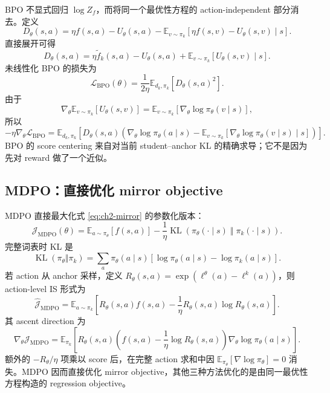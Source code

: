 BPO 不显式回归 $\log Z_f$，而将同一个最优性方程的 action-independent 部分消去。定义
\begin{equation}
\label{eq:ch2-bpo-residual}
D_\theta(s,a)
=\eta f(s,a)-U_\theta(s,a)
-\mathbb E_{v\sim\pi_k}[\eta f(s,v)-U_\theta(s,v)\mid s].
\end{equation}
直接展开可得
\[
D_\theta(s,a)
=\eta\widetilde f_k(s,a)-U_\theta(s,a)
+\mathbb E_{v\sim\pi_k}[U_\theta(s,v)\mid s].
\]
未线性化 BPO 的损失为
\begin{equation}
\label{eq:ch2-bpo-loss}
\mathcal L_{\mathrm{BPO}}(\theta)
=\frac1{2\eta}\mathbb E_{d_k,\pi_k}[D_\theta(s,a)^2].
\end{equation}
由于
\[
\nabla_\theta\mathbb E_{v\sim\pi_k}[U_\theta(s,v)]
=\mathbb E_{v\sim\pi_k}[\nabla_\theta\log\pi_\theta(v\mid s)],
\]
所以
\begin{equation}
\label{eq:ch2-bpo-gradient}
-\eta\nabla_\theta\mathcal L_{\mathrm{BPO}}
=\mathbb E_{d_k,\pi_k}\left[D_\theta(s,a)
\left(\nabla_\theta\log\pi_\theta(a\mid s)
-\mathbb E_{v\sim\pi_k}[\nabla_\theta\log\pi_\theta(v\mid s)\mid s]\right)\right].
\end{equation}
BPO 的 score centering 来自对当前 student--anchor KL 的精确求导；它不是因为先对 reward 做了一个近似。

\subsection{MDPO：直接优化 mirror objective}
\label{sec:ch2-mdpo-generic}

MDPO 直接最大化式 \eqref{eq:ch2-mirror} 的参数化版本：
\begin{equation}
\label{eq:ch2-mdpo-generic-objective}
\mathcal J_{\mathrm{MDPO}}(\theta)
=\mathbb E_{a\sim\pi_\theta}[f(s,a)]
-\frac1\eta\operatorname{KL}\!\left(\pi_\theta(\cdot\mid s)\middle\Vert\pi_k(\cdot\mid s)\right).
\end{equation}
完整词表时 KL 是
\begin{equation}
\label{eq:ch2-mdpo-full-kl}
\operatorname{KL}(\pi_\theta\Vert\pi_k)
=\sum_a\pi_\theta(a\mid s)
\left[\log\pi_\theta(a\mid s)-\log\pi_k(a\mid s)\right].
\end{equation}
若 action 从 anchor 采样，定义 $R_\theta(s,a)=\exp(\ell^\theta(a)-\ell^k(a))$，则 action-level IS 形式为
\begin{equation}
\label{eq:ch2-mdpo-sample-integrand}
\widehat{\mathcal J}_{\mathrm{MDPO}}
=\mathbb E_{a\sim\pi_k}\left[R_\theta(s,a)f(s,a)-\frac1\eta R_\theta(s,a)\log R_\theta(s,a)\right].
\end{equation}
其 ascent direction 为
\begin{equation}
\label{eq:ch2-mdpo-generic-gradient}
\nabla_\theta\mathcal J_{\mathrm{MDPO}}
=\mathbb E_{\pi_k}\left[R_\theta(s,a)\left(f(s,a)-\frac1\eta\log R_\theta(s,a)\right)\nabla_\theta\log\pi_\theta(a\mid s)\right].
\end{equation}
额外的 $-R_\theta/\eta$ 项乘以 score 后，在完整 action 求和中因 $\mathbb E_{\pi_\theta}[\nabla\log\pi_\theta]=0$ 消失。MDPO 因而直接优化 mirror objective，其他三种方法优化的是由同一最优性方程构造的 regression objective。

